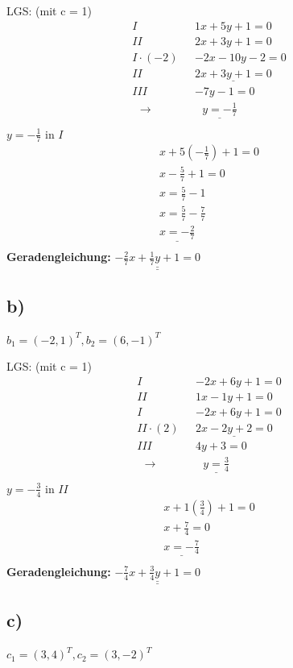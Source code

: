\documentclass{article}
\begin{document}
LGS: (mit c = 1)
\begin{align*}
    I \ \ \ & 1x + 5y + 1 = 0 \\
    II \ \ \ & 2x + 3y + 1 = 0 \\
    I \cdot (-2) \ \ \ & -2x - 10y - 2 = 0\\
    II \ \ \ & \underline{ 2x + 3y + 1= 0} \\
    III \ \ \ & -7y - 1 = 0 \\
    \ \ \ \rightarrow & \ \ \ \underline{y = -\frac{1}{7}} \\
\end{align*}
$y = -\frac{1}{7}$ in $I$
\begin{align*}
    x + 5(-\frac{1}{7}) + 1 = 0 \\
    x - \frac{5}{7} + 1 = 0 \\
    x = \frac{5}{7} - 1 \\
    x = \frac{5}{7} - \frac{7}{7} \\
    \underline{x = -\frac{2}{7}} \\
\end{align*}
\textbf{Geradengleichung:} $\underline{\underline{-\frac{2}{7}x + \frac{1}{7}y + 1= 0}}$

\subsection*{b)}
$b_1 = (-2,1)^T, b_2 = (6,-1)^T$

LGS: (mit c = 1)
\begin{align*}
    I \ \ \ & -2x + 6y + 1 = 0 \\
    II \ \ \ & 1x - 1y + 1 = 0 \\
    I  \ \ \ & -2x + 6y + 1 = 0\\
    II \cdot (2)\ \ \ & \underline{ 2x - 2y + 2= 0} \\
    III \ \ \ & 4y + 3 = 0 \\
    \ \ \ \rightarrow & \ \ \ \underline{y = \frac{3}{4}} \\
\end{align*}
$y = -\frac{3}{4}$ in $II$
\begin{align*}
    x + 1(\frac{3}{4}) + 1 = 0 \\
    x + \frac{7}{4} = 0 \\
    \underline{x = -\frac{7}{4}} \\
\end{align*}
\textbf{Geradengleichung:} $\underline{\underline{-\frac{7}{4}x + \frac{3}{4}y + 1 = 0}}$

\subsection*{c)}
$c_1 = (3,4)^T, c_2 = (3,-2)^T$
\end{document}
